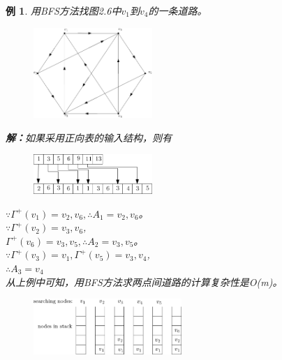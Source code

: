 \documentclass[11pt,a4paper,openany]{book}
\newtheorem{sample}{\textbf{例}}[section]
\begin{document}
\begin{sample}
用BFS方法找图2.6中$v_1$到$v_4$的一条道路。
\begin{figure}[!ht]
  \centering
  \includegraphics[width=0.4\textwidth]{2.6.png}\\
  \caption{}\label{fig:2.6}
\end{figure}
\textbf{解：}如果采用正向表的输入结构，则有\\
\begin{figure}[h]
  \centering
   \vspace{-10pt}
  \includegraphics[width=0.4\textwidth]{2.6BFS.png}\\
  \caption*{}\label{} \vspace{-40pt}
\end{figure}
$\because \Gamma^{+}(v_1)={v_2,v_6},\therefore A_1={v_2,v_6}$。\\
$\because \Gamma^{+}(v_2)={v_3,v_6}$,\\
$\Gamma^{+}(v_6)={v_3,v_5},\therefore A_2={v_3,v_5}$。\\
$\because  \Gamma^{+}(v_3)={v_1},\Gamma^{+}(v_5)={v_3,v_4}$,\\
$\therefore A_3={v_4}$\\
\indent 从上例中可知，用BFS方法求两点间道路的计算复杂性是O(m)。
\end{sample}
\begin{figure}[h]
  \centering
  \vspace{-10pt}
  \includegraphics[width=0.5\textwidth]{2.6DFS.png}
  \caption{}\label{fig:2.7}\vspace{-25pt}
\end{figure}
\end{document}

